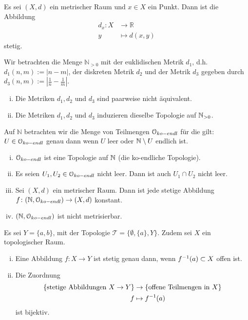 \begin{aufgabe}
Es sei $(X,d)$ ein metrischer Raum und $x\in X$ ein Punkt. Dann ist die Abbildung
\begin{align*}
d_x\colon X& \to \mathbb R\\
y& \mapsto d(x,y)
\end{align*}
stetig.
\end{aufgabe}

\begin{aufgabe}
Wir betrachten die Menge $\mathbb N_{>0}$ mit der euklidischen Metrik $d_1$, d.h.\ $d_1(n,m):=|n-m|$, der diskreten Metrik $d_2$ und der Metrik $d_3$ gegeben durch $d_3(n,m):=|\tfrac{1}{n}-\tfrac{1}{m}|$.
\begin{enumerate}[i)]
	\item Die Metriken $d_1, d_2$ und $d_3$ sind paarweise nicht äquivalent.
	\item Die Metriken $d_1, d_2$ und $d_3$ induzieren dieselbe Topologie auf $\mathbb{N}_{>0}$.
\end{enumerate}
\end{aufgabe}

\begin{aufgabe}
	Auf $\mathbb{N}$ betrachten wir die Menge von Teilmengen $\mathcal O_{ko-endl}$ für die gilt: $U\in \mathcal O_{ko-endl}$ genau dann wenn $U$ leer oder $\mathbb{N}\setminus U$ endlich ist.
\begin{enumerate}[i)]
	\item $\mathcal O_{ko-endl}$ ist eine Topologie auf $\mathbb{N}$ (die ko-endliche Topologie).
	\item Es seien $U_1, U_2 \in \mathcal O_{ko-endl}$ nicht leer. Dann ist auch $U_1\cap U_2$ nicht leer.
	\item Sei $(X,d)$ ein metrischer Raum. Dann ist jede stetige Abbildung $f\colon (\mathbb N,\mathcal O_{ko-endl})\to (X,d)$ konstant.
	\item $(\mathbb N,\mathcal O_{ko-endl})$ ist nicht metrisierbar.
\end{enumerate}
\end{aufgabe}

\begin{aufgabe}
Es sei $Y= \{a,b\}$, mit der Topologie $\mathcal T= \{ \emptyset, \{a\}, Y\}$. Zudem sei $X$ ein topologischer Raum.
\begin{enumerate}[i)]
	\item Eine Abbildung $f\colon X\to Y$ ist stetig genau dann, wenn $f^{-1}(a)\subset X$ offen ist. 
	\item Die Zuordnung 
		\begin{align*}
		\{ \textup{stetige Abbildungen } X\to Y\} & \to \{ \textup{offene Teilmengen in } X\} \\
		f& \mapsto f^{-1} (a)
		\end{align*}
		ist bijektiv.
\end{enumerate}
\end{aufgabe}

